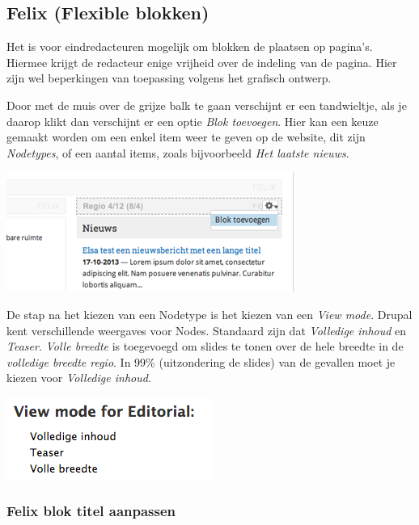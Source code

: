 \subsection{Felix (Flexible blokken)}\label{felix}
Het is voor eindredacteuren mogelijk om blokken de plaatsen op pagina's. Hiermee krijgt de redacteur enige vrijheid over de indeling van de pagina. Hier zijn wel beperkingen van toepassing volgens het grafisch ontwerp.

Door met de muis over de grijze balk te gaan verschijnt er een tandwieltje, als je daarop klikt dan verschijnt er een optie \emph{Blok toevoegen}. Hier kan een keuze gemaakt worden om een enkel item weer te geven op de website, dit zijn \emph{Nodetypes}, of een aantal items, zoals bijvoorbeeld \emph{Het laatste nieuws}.

\begin{center}
	\includegraphics[width=\textwidth]{img/felix.png}
\end{center}

De stap na het kiezen van een Nodetype is het kiezen van een \emph{View mode}. Drupal kent verschillende weergaves voor Nodes. Standaard zijn dat \emph{Volledige inhoud} en \emph{Teaser}. \emph{Volle breedte} is toegevoegd om slides te tonen over de hele breedte in de \emph{volledige breedte regio}. In 99\% (uitzondering de slides) van de gevallen moet je kiezen voor \emph{Volledige inhoud}.

\begin{center}
	\includegraphics[scale=1.0]{img/felixviewmode.png}
\end{center}

\subsubsection{Felix blok titel aanpassen}\label{felixbloktitel}

